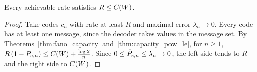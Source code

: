\begin{theorem}
  \label{thm:converse}
  \leanok
  Every achievable rate satisfies $R \le C(W)$.
\end{theorem}
\begin{proof}
  \leanok
  Take codes $c_n$ with rate at least $R$ and maximal error $\lambda_n \to 0$.  Every code has at
  least one message, since the decoder takes values in the message set.  By
  Theorems~\ref{thm:fano_capacity} and~\ref{thm:capacity_pow_le}, for $n \ge 1$,
  $R\,(1 - \bar P_{e,n}) \le C(W) + \frac{\log 2}{n}$.  Since $0 \le \bar P_{e,n} \le \lambda_n \to 0$, the
  left side tends to $R$ and the right side to $C(W)$.
\end{proof}
